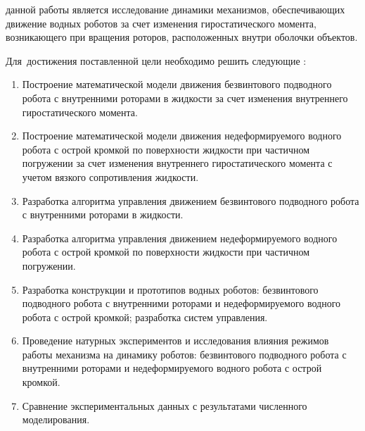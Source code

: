 
{\aim} данной работы является исследование динамики механизмов, обеспечивающих движение водных роботов за счет изменения гиростатического момента, возникающего при вращения роторов, расположенных внутри оболочки объектов.

Для~достижения поставленной цели необходимо решить следующие {\tasks}:
\begin{enumerate}
  \item Построение математической модели движения безвинтового подводного робота с внутренними роторами в жидкости за счет изменения внутреннего гиростатического момента.
  \item Построение математической модели движения недеформируемого водного робота с острой кромкой по поверхности жидкости при частичном погружении за счет изменения внутреннего гиростатического момента с учетом вязкого сопротивления жидкости.
  \item Разработка алгоритма управления движением безвинтового подводного робота с внутренними роторами в жидкости.
  \item Разработка алгоритма управления движением недеформируемого водного робота с острой кромкой по поверхности жидкости при частичном погружении.
  \item Разработка конструкции и прототипов водных роботов: безвинтового подводного робота с внутренними роторами и недеформируемого водного робота с острой кромкой; разработка систем управления.
  \item Проведение натурных экспериментов и исследования влияния режимов работы механизма на динамику роботов: безвинтового подводного робота с внутренними роторами и недеформируемого водного робота с острой кромкой.
  \item Сравнение экспериментальных данных с результатами численного моделирования.
\end{enumerate}



